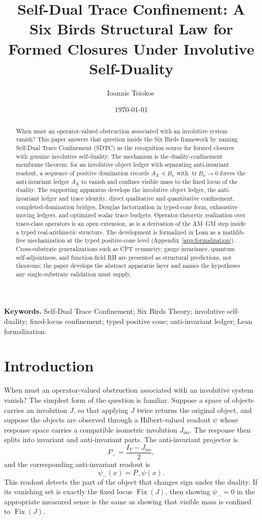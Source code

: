 \documentclass[11pt]{article}
\title{Self-Dual Trace Confinement: A Six Birds Structural Law for Formed Closures Under Involutive Self-Duality}
\author{Ioannis Tsiokos\,\orcidlink{0009-0009-7659-5964}}
\date{\today}
\DeclareMathOperator{\Fix}{Fix}
\DeclareMathOperator{\trace}{tr}
\newcommand{\Pminus}{P_{-}}
\newcommand{\psim}{\psi_{-}}
\newcommand{\AX}{A_{X}}
\newcommand{\Jiso}{J_{\mathrm{iso}}}
\theoremstyle{definition}
\begin{document}
\maketitle
\thispagestyle{firstpage}

\begin{abstract}
When must an operator-valued obstruction associated with an
involutive system vanish?  This paper answers that question inside
the Six Birds framework by naming Self-Dual Trace Confinement
(SDTC) as the recognition source for formed closures with genuine
involutive self-duality.  The mechanism is the
duality-confinement membrane theorem: for an involutive object
ledger with separating anti-invariant readout, a sequence of
positive domination records \(\AX\preceq B_n\) with
\(\trace B_n\to0\) forces the anti-invariant ledger \(\AX\) to
vanish and confines visible mass to the fixed locus of the
duality.  The supporting apparatus develops the involutive object
ledger, the anti-invariant ledger and trace identity, direct
qualitative and quantitative confinement, completed-domination
bridges, Douglas factorization in typed-cone form, exhaustive
moving ledgers, and optimized scalar trace budgets.
Operator-theoretic realization over trace-class operators is an
open extension, as is a derivation of the AM--GM step inside a
typed real-arithmetic structure.  The development is formalized in
Lean as a mathlib-free mechanization at the typed positive-cone
level (Appendix~\ref{app:formalization}).  Cross-substrate
generalizations such as CPT symmetry,
gauge invariance, quantum self-adjointness, and function-field RH
are presented as structural predictions, not theorems; the paper
develops the abstract apparatus layer and names the hypotheses any
single-substrate validation must supply.
\end{abstract}

\medskip
\noindent\textbf{Keywords.} Self-Dual Trace Confinement; Six Birds Theory; involutive self-duality; fixed-locus confinement; typed positive cone; anti-invariant ledger; Lean formalization.



\section{Introduction}
\label{sec:intro}

When must an operator-valued obstruction associated with an
involutive system vanish?  The simplest form of the question is
familiar.  Suppose a space of objects carries an involution \(J\),
so that applying \(J\) twice returns the original object, and
suppose the objects are observed through a Hilbert-valued readout
\(\psi\) whose response space carries a compatible isometric
involution \(\Jiso\).  The response then splits into invariant and
anti-invariant parts.  The anti-invariant projector is
\[
  \Pminus = \frac{I_Y-\Jiso}{2},
\]
and the corresponding anti-invariant readout is
\[
  \psim(x) = \Pminus \psi(x).
\]
This readout detects the part of the object that changes sign under
the duality.  If its vanishing set is exactly the fixed locus
\(\Fix(J)\), then showing \(\psim=0\) in the appropriate measured
sense is the same as showing that visible mass is confined to
\(\Fix(J)\).
\end{document}
